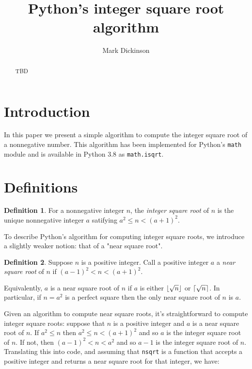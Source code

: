 \documentclass[a4paper]{article}
\title{Python's integer square root algorithm}
\author{Mark Dickinson}
\DeclarePairedDelimiter\floor{\lfloor}{\rfloor}
\DeclarePairedDelimiter\ceil{\lceil}{\rceil}
\theoremstyle{plain}
\theoremstyle{definition}
\newtheorem{definition}{Definition}
\begin{document}
\lstset{language=Python}
\maketitle
\begin{abstract}
TBD
\end{abstract}
\section{Introduction}

In this paper we present a simple algorithm to compute the integer square root
of a nonnegative number. This algorithm has been implemented for Python's
\lstinline{math} module and is available in Python 3.8 as
\lstinline{math.isqrt}.

\section{Definitions}

\begin{definition}
  For a nonnegative integer $n$, the \emph{integer square root} of $n$ is
  the unique nonnegative integer $a$ satifying $a^2 \le n < (a + 1)^2$.
\end{definition}

To describe Python's algorithm for computing integer square roots, we introduce
a slightly weaker notion: that of a "near square root".

\begin{definition}
  Suppose $n$ is a positive integer. Call a positive integer $a$ a
  \emph{near square root} of $n$ if $(a - 1)^2 < n < (a + 1)^2$.
\end{definition}

Equivalently, $a$ is a near square root of $n$ if $a$ is either $\floor{\sqrt
n}$ or $\ceil{\sqrt n}$. In particular, if $n = a^2$ is a perfect square then
the only near square root of $n$ is $a$.

Given an algorithm to compute near square roots, it's straightforward to
compute integer square roots: suppose that $n$ is a positive integer and $a$ is
a near square root of $n$. If $a^2 \le n$ then $a^2 \le n < (a + 1)^2$ and so
$a$ is the integer square root of $n$. If not, then $(a - 1)^2 < n < a^2$ and
so $a - 1$ is the integer square root of $n$. Translating this into code,
and assuming that \lstinline{nsqrt} is a function that accepts a positive
integer and returns a near square root for that integer, we have:
\end{document}
